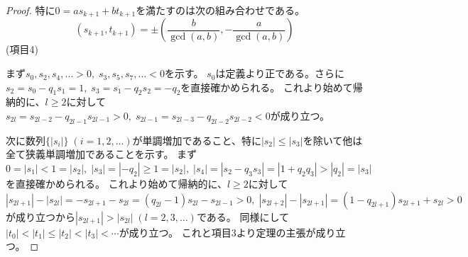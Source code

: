 \begin{proof}
            特に$0 = as_{k+1} + bt_{k+1}$を満たすのは次の組み合わせである。
            \[ (s_{k+1},t_{k+1}) = \pm\left(\frac{b}{\gcd(a,b)}, -\frac{a}{\gcd(a,b)}\right) \]
            \newline
            (項目4)
            \par
            まず$s_0,s_2,s_4,\dotsc>0,\;s_3,s_5,s_7,\dotsc<0$を示す。
            $s_0$は定義より正である。さらに$s_2 = s_0 - q_1s_1 = 1,\;s_3 = s_1 - q_2s_2 = -q_2$を直接確かめられる。
            これより始めて帰納的に、$l\geq 2$に対して$s_{2l} = s_{2l-2} - q_{2l-1}s_{2l-1} > 0,\;s_{2l-1} = s_{2l-3} - q_{2l-2}s_{2l-2} < 0$が成り立つ。
            \par
            次に数列$\{|s_i|\}\;(i=1,2,\dotsc)$が単調増加であること、特に$|s_2|\leq|s_3|$を除いて他は全て狭義単調増加であることを示す。
            まず$0 = |s_1| < 1 = |s_2|,\;|s_3| = |-q_2| \geq 1 = |s_2|,\;|s_4| = |s_2 - q_3s_3| = |1 + q_2q_3| > |q_2| = |s_3|$を直接確かめられる。
            これより始めて帰納的に、$l\geq 2$に対して$|s_{2l+1}| - |s_{2l}| = -s_{2l+1} - s_{2l} = (q_{2l}-1)s_{2l} - s_{2l-1} > 0,\;|s_{2l+2}| - |s_{2l+1}| = (1-q_{2l+1})s_{2l+1} + s_{2l} > 0$が成り立つから$|s_{2l+1}| > |s_{2l}|\;(l=2,3,\dotsc)$である。
            同様にして$|t_0| < |t_1| \leq |t_2| < |t_3| < \dotsb$が成り立つ。
            これと項目3より定理の主張が成り立つ。
        \end{proof}